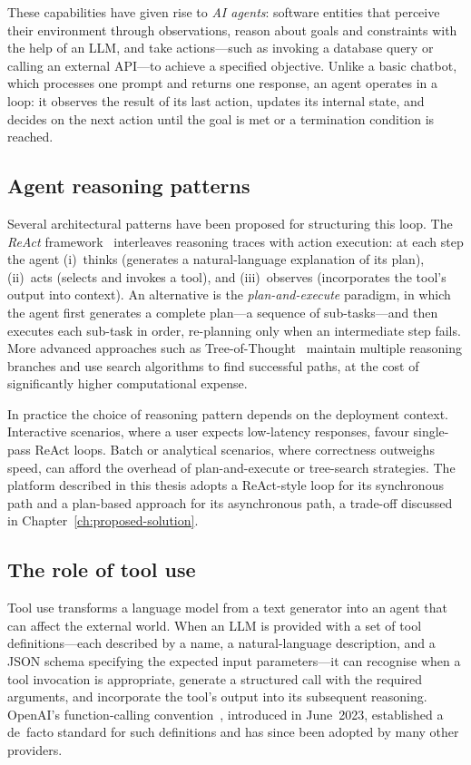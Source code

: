 \documentclass[a4paper]{sapthesis}
\begin{document}
These capabilities have given rise to \emph{AI agents}: software entities
that perceive their environment through observations, reason about goals and
constraints with the help of an LLM, and take actions---such as invoking
a database query or calling an external API---to achieve a specified
objective.  Unlike a basic chatbot, which processes one prompt and returns
one response, an agent operates in a loop: it observes the result of its
last action, updates its internal state, and decides on the next action
until the goal is met or a termination condition is reached.

\subsection{Agent reasoning patterns}

Several architectural patterns have been proposed for structuring this
loop.  The \emph{ReAct} framework~\cite{yao2022react} interleaves
reasoning traces with action execution: at each step the agent (i)~thinks
(generates a natural-language explanation of its plan), (ii)~acts (selects
and invokes a tool), and (iii)~observes (incorporates the tool's output
into context).  An alternative is the \emph{plan-and-execute} paradigm,
in which the agent first generates a complete plan---a sequence of
sub-tasks---and then executes each sub-task in order, re-planning only
when an intermediate step fails.  More advanced approaches such as
Tree-of-Thought~\cite{yao2023tree} maintain multiple reasoning branches
and use search algorithms to find successful paths, at the cost of
significantly higher computational expense.

In practice the choice of reasoning pattern depends on the deployment
context.  Interactive scenarios, where a user expects low-latency
responses, favour single-pass ReAct loops.  Batch or analytical
scenarios, where correctness outweighs speed, can afford the overhead of
plan-and-execute or tree-search strategies.  The platform described in
this thesis adopts a ReAct-style loop for its synchronous path and a
plan-based approach for its asynchronous path, a trade-off discussed in
Chapter~\ref{ch:proposed-solution}.

\subsection{The role of tool use}

Tool use transforms a language model from a text generator into an agent
that can affect the external world.  When an LLM is provided with a set
of tool definitions---each described by a name, a natural-language
description, and a JSON schema specifying the expected input parameters---it
can recognise when a tool invocation is appropriate, generate a structured
call with the required arguments, and incorporate the tool's output into
its subsequent reasoning.  OpenAI's function-calling
convention~\cite{openai2023functions}, introduced in June~2023, established
a de~facto standard for such definitions and has since been adopted by many
other providers.
\end{document}

